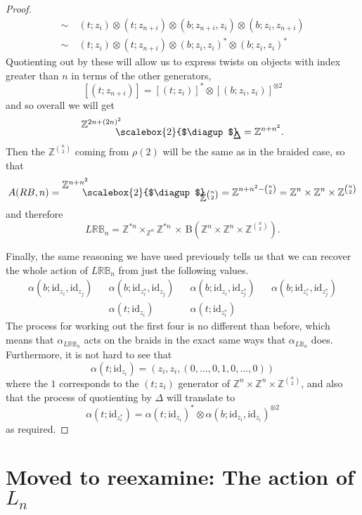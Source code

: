 \documentclass{amsbook} %
\newcommand{\id}{\textrm{id}}
\newcommand{\bigquotient}[2]{ \raisebox{0.75\height}{$#1$} \mkern-12mu\scalebox{2}{$\diagup$}\mkern-10mu \raisebox{-0.5\height}{$#2$} }
\numberwithin{section}{chapter}
\begin{document}
\begin{proof}
\begin{align*}
  	\sim~&(t ; z_i) \otimes (t ; z_{n+i}) \otimes (b ;  z_{n+i}, z_i) \otimes (b ;  z_i, z_{n+i}) \\
  	\sim~&(t ; z_i) \otimes (t ; z_{n+i}) \otimes (b ;  z_i, z_i)^* \otimes (b;  z_i, z_i)^*
  \end{align*}
Quotienting out by these will allow us to express twists on objects with index greater than $n$ in terms of the other generators,
  \[
    [  (  t  ;  z_{n+i}  )  ] = [  (  t  ;  z_i  )  ]^* \otimes [  (  b  ;  z_i, z_i  )  ]^{\otimes 2}
  \]
and so overall we will get
  \[
    \bigquotient{\mathbb{Z}^{2n + (2n)^2}}{\Delta} = \mathbb{Z}^{n + n^2}.
  \]
Then the $\mathbb{Z}^{\binom{n}{2}}$ coming from $\rho(2)$ will be the same as in the braided case, so that
  \[
    A(RB,n) = \bigquotient{\mathbb{Z}^{n + n^2}}{\mathbb{Z}^{\binom{n}{2}}} = \mathbb{Z}^{n + n^2 - {\binom{n}{2}}} = \mathbb{Z}^{n} \times \mathbb{Z}^{n} \times \mathbb{Z}^{\binom{n}{2}}
  \]
and therefore
  \[
  L\mathbb{RB}_n = \mathbb{Z}^{\ast n} \times_{\mathbb{Z}^n} \mathbb{Z}^{\ast n}  \, \times \, \mathrm{B}(\mathbb{Z}^{n} \times \mathbb{Z}^{n} \times \mathbb{Z}^{\binom{n}{2}}).
  \]

Finally, the same reasoning we have used previously tells us that we can recover the whole action of $L\mathbb{RB}_n$ from just the following values.
  \[
    \begin{array}{ccccccc}
  		\alpha(  b  ;  \id_{z_i}, \id_{z_j}  ) &  & \alpha(  b  ;  \id_{z_i^*}, \id_{z_j}  ) &  & \alpha(  b  ;  \id_{z_i}, \id_{z_j^*}  ) &  & \alpha(  b  ;  \id_{z_i^*}, \id_{z_j^*}  ) \\
  		& & \alpha(  t  ;  \id_{z_i}  ) &  & \alpha(  t  ;  \id_{z_i^*}  ) & &
    \end{array}
  \]
The process for working out the first four is no different than before, which means that $\alpha_{L\mathbb{RB}_n}$ acts on the braids in the exact same ways that $\alpha_{L\mathbb{B}_n}$ does. Furthermore, it is not hard to see that
  \[
    \alpha(  t  ;  \id_{z_i}  ) = \left(  z_i,  z_i,  (0,\ldots,0, 1, 0,\ldots,0)  \right)
  \]
where the $1$ corresponds to the $(t ; z_i)$ generator of $\mathbb{Z}^{n} \times \mathbb{Z}^{n} \times \mathbb{Z}^{\binom{n}{2}}$, and also that the process of quotienting by $\Delta$ will translate to 
  \[
    \alpha(  t  ;  \id_{z_i^*}  ) = \alpha(  t  ;  \id_{z_i}  )^* \otimes \alpha(  b  ;  \id_{z_i}, \id_{z_i}  )^{\otimes 2}
  \]
as required.
\end{proof}  


\section{Moved to reexamine: The action of \texorpdfstring{$L_n$}{L_n}}
\end{document}
